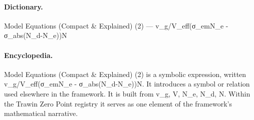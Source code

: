 \paragraph{Dictionary.}
Model Equations (Compact \& Explained) (2) — v\_g/V\_eff(σ\_emN\_e - σ\_abs(N\_d-N\_e))N

\paragraph{Encyclopedia.}
Model Equations (Compact \& Explained) (2) is a symbolic expression, written v\_g/V\_eff(σ\_emN\_e - σ\_abs(N\_d-N\_e))N. It introduces a symbol or relation used elsewhere in the framework. It is built from v\_g, V, N\_e, N\_d, N. Within the Trawin Zero Point registry it serves as one element of the framework's mathematical narrative.
